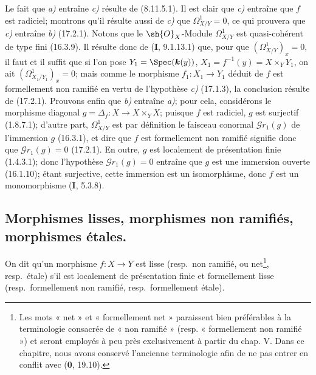 Le fait que \emph{a)} entraîne \emph{c)} résulte de (8.11.5.1). Il est clair que \emph{c)} entraîne que $f$ est radiciel; montrons qu'il résulte aussi de \emph{c)} que $\varOmega_{X/Y}^1=0$, ce qui prouvera que \emph{c)} entraîne \emph{b)} (17.2.1). Notons que le $\sh{O}_X$-Module $\varOmega_{X/Y}^1$ est quasi-cohérent de type fini (16.3.9). Il résulte donc de (\textbf{I}, 9.1.13.1) que, pour que $(\varOmega_{X/Y}^1)_x=0$, il faut et il suffit que si l'on pose $Y_1=\Spec(\boldsymbol{k}(y))$, $X_1=f^{-1}(y)=X\times_Y Y_1$, on ait $(\varOmega_{X_1/Y_1}^1)_x=0$; mais comme le morphisme $f_1:X_1\to Y_1$ déduit de $f$ est formellement non ramifié en vertu de l'hypothèse \emph{c)} (17.1.3), la conclusion résulte de (17.2.1). Prouvons enfin que \emph{b)} entraîne \emph{a)}; pour cela, considérons le morphisme diagonal $g=\Delta_f:X\to X\times_Y X$; puisque $f$ est radiciel, $g$ est surjectif (1.8.7.1); d'autre part, $\varOmega_{X/Y}^1$ est par définition le faisceau conormal $\mathscr{G}r_1(g)$ de l'immersion $g$ (16.3.1), et dire que $f$ est formellement non ramifié signifie donc que
$\mathscr{G}r_1(g)=0$ (17.2.1). En outre, $g$ est localement de présentation finie (1.4.3.1); donc l'hypothèse $\mathscr{G}r_1(g)=0$ entraîne que $g$ est une immersion ouverte (16.1.10); étant surjective, cette immersion est un isomorphisme, donc $f$ est un monomorphisme (\textbf{I}, 5.3.8).

\subsection{Morphismes lisses, morphismes non ramifiés, morphismes étales.}

\begin{definition}[17.3.1]
On dit qu'un morphisme $f:X\to Y$ est lisse \textup{(resp.}\ non ramifié, \textup{ou} net\footnote{Les mots « net » et « formellement net » paraissent bien préférables à la terminologie consacrée de « non ramifié » (resp. « formellement non ramifié ») et seront employés à peu près exclusivement à partir du chap. V. Dans ce chapitre, nous avons conservé l'ancienne terminologie afin de ne pas entrer en conflit avec (\textbf{0}, 19.10).}, \textup{resp.}\ étale\textup{)} s'il est localement de présentation finie et formellement lisse \textup{(resp.}\ formellement non ramifié, \textup{resp.}\ formellement étale\textup{)}.
\end{definition}

